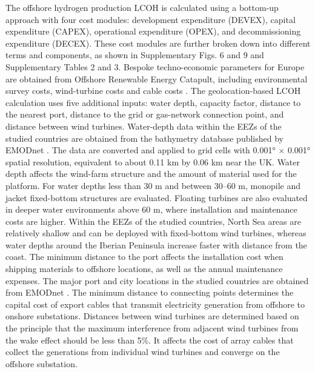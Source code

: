 \documentclass[pdflatex,sn-mathphys,Numbered]{sn-jnl}%
\begin{document}
The offshore hydrogen production LCOH is calculated using a bottom-up approach with four cost modules: development expenditure (DEVEX), capital expenditure (CAPEX), operational expenditure (OPEX), and decommissioning expenditure (DECEX). These cost modules are further broken down into different terms and components, as shown in Supplementary Figs. 6 and 9 and Supplementary Tables 2 and 3. Bespoke techno-economic parameters for Europe are obtained from Offshore Renewable Energy Catapult, including environmental survey costs, wind-turbine costs and cable costs \cite{OffshoreWindandHydrogen}.
The geolocation-based LCOH calculation uses five additional inputs: water depth, capacity factor, distance to the nearest port, distance to the grid or gas-network connection point, and distance between wind turbines.
Water-depth data within the EEZs of the studied countries are obtained from the bathymetry database published by EMODnet \cite{bathymetry_2022}. The data are converted and applied to grid cells with 0.001° $\times$ 0.001° spatial resolution, equivalent to about 0.11 km by 0.06 km near the UK.
Water depth affects the wind-farm structure and the amount of material used for the platform. For water depths less than 30 m and between 30--60 m, monopile and jacket fixed-bottom structures are evaluated. Floating turbines are also evaluated in deeper water environments above 60 m, where installation and maintenance costs are higher. Within the EEZs of the studied countries, North Sea areas are relatively shallow and can be deployed with fixed-bottom wind turbines, whereas water depths around the Iberian Peninsula increase faster with distance from the coast.
The minimum distance to the port affects the installation cost when shipping materials to offshore locations, as well as the annual maintenance expenses. The major port and city locations in the studied countries are obtained from EMODnet \cite{EMODnet}.
The minimum distance to connecting points determines the capital cost of export cables that transmit electricity generation from offshore to onshore substations.
Distances between wind turbines are determined based on the principle that the maximum interference from adjacent wind turbines from the wake effect should be less than 5\%. It affects the cost of array cables that collect the generations from individual wind turbines and converge on the offshore substation.
\end{document}
